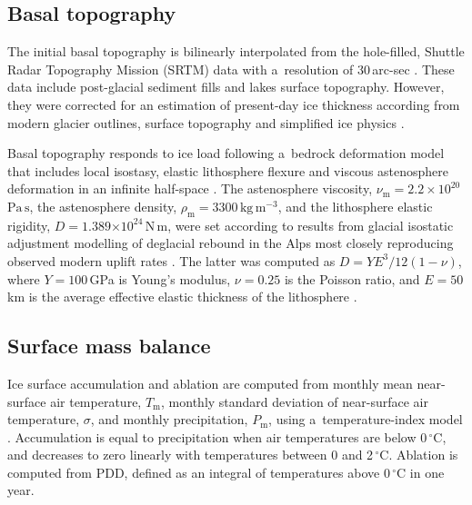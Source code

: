 \documentclass{article}
\newcommand{\e}[1]{\ensuremath{\times 10^{#1}}}
\newcommand{\unit}[1]{\ensuremath{\mathrm{#1}}}
\newcommand{\degree}[0]{\ensuremath{^{\circ}}}
\begin{document}
\subsection{Basal topography}
\label{sec:bedrock}

    The initial basal topography is bilinearly interpolated from the
    hole-filled, Shuttle Radar Topography Mission (SRTM) data with a~resolution
    of 30\,arc-sec \citep{Jarvis.etal.2008}. These data include post-glacial
    sediment fills and lakes surface topography. However, they were corrected
    for an estimation of present-day ice thickness according from modern
    glacier outlines, surface topography and simplified ice physics
    \citep{Huss.Farinotti.2012}.

    Basal topography responds to ice load following a~bedrock deformation model
    that includes local isostasy, elastic lithosphere flexure and viscous
    astenosphere deformation in an infinite half-space
    \citep{Lingle.Clark.1985,Bueler.etal.2007}. The astenosphere viscosity,
    $\nu_{\mathrm{m}}=2.2\times10^{20}$\,\unit{Pa\,s}, the astenosphere
    density, $\rho_{\mathrm{m}}=3300$\,\unit{kg\,m^{-3}}, and the lithosphere
    elastic rigidity, $D=1.389\e{24}$\,\unit{N\,m}, were set according to
    results from glacial isostatic adjustment modelling of deglacial rebound in
    the Alps most closely reproducing observed modern uplift rates
    \citep[Table~\ref{tab:params};][Supplementary Fig.~7]{Mey.etal.2016}. The
    latter was computed as $D=YE^3/12(1-\nu)$, where $Y=100$\,GPa is Young's
    modulus, $\nu=0.25$ is the Poisson ratio, and $E=50$\,km is the average
    effective elastic thickness of the lithosphere
    \citep[Table~\ref{tab:params};][]{Mey.etal.2016}.

\subsection{Surface mass balance}
\label{sec:surface}

      Ice surface accumulation and ablation are computed from monthly mean
      near-surface air temperature, $T_{\mathrm{m}}$, monthly standard
      deviation of near-surface air temperature, $\sigma$, and monthly
      precipitation, $P_{\mathrm{m}}$, using a~temperature-index model
      \citep[e.g.,][]{Hock.2003}. Accumulation is equal to precipitation
      when air temperatures are below 0\,\unit{{\degree}C}, and decreases to
      zero linearly with temperatures between 0 and 2\,\unit{{\degree}C}.
      Ablation is computed from PDD, defined as an integral of temperatures
      above 0\,\unit{{\degree}C} in one year.
\end{document}

